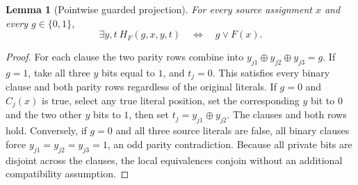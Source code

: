 \documentclass[11pt]{article}
\newtheorem{lemma}[theorem]{Lemma}
\begin{document}
\begin{lemma}[Pointwise guarded projection]\label{lem:gadget}
For every source assignment $x$ and every $g\in\{0,1\}$,
\[
 \exists y,t\ H_F(g,x,y,t)\quad\Longleftrightarrow\quad
 g\vee F(x).
\]
\end{lemma}
\begin{proof}
For each clause the two parity rows combine into $y_{j1}\oplus y_{j2}\oplus y_{j3}=g$. If $g=1$, take all three $y$ bits equal to $1$, and $t_j=0$. This satisfies every binary clause and both parity rows regardless of the original literals. If $g=0$ and $C_j(x)$ is true, select any true literal position, set the corresponding $y$ bit to $0$ and the two other $y$ bits to $1$, then set $t_j=y_{j1}\oplus y_{j2}$. The clauses and both rows hold. Conversely, if $g=0$ and all three source literals are false, all binary clauses force $y_{j1}=y_{j2}=y_{j3}=1$, an odd parity contradiction. Because all private bits are disjoint across the clauses, the local equivalences conjoin without an additional compatibility assumption.
\end{proof}
\end{document}
